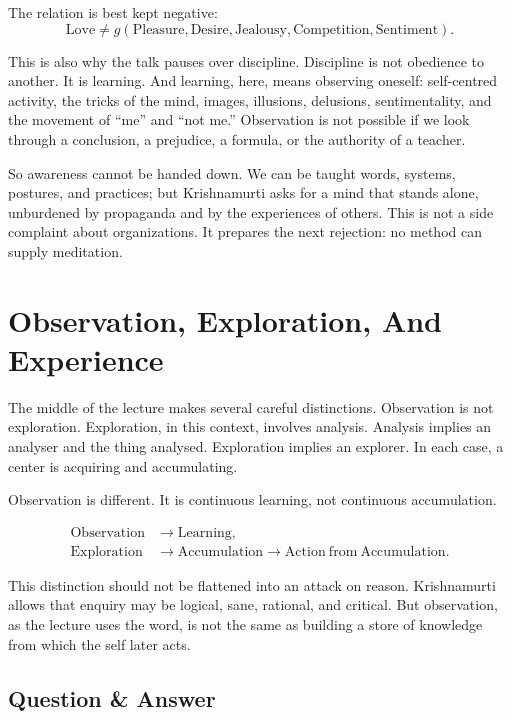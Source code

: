 The relation is best kept negative:
\begin{equation}
\mathrm{Love}
\neq
g(\mathrm{Pleasure},\mathrm{Desire},\mathrm{Jealousy},\mathrm{Competition},\mathrm{Sentiment}).
\end{equation}

This is also why the talk pauses over discipline. Discipline is not obedience to another. It is learning. And learning, here, means observing oneself: self-centred activity, the tricks of the mind, images, illusions, delusions, sentimentality, and the movement of ``me'' and ``not me.'' Observation is not possible if we look through a conclusion, a prejudice, a formula, or the authority of a teacher.

So awareness cannot be handed down. We can be taught words, systems, postures, and practices; but Krishnamurti asks for a mind that stands alone, unburdened by propaganda and by the experiences of others. This is not a side complaint about organizations. It prepares the next rejection: no method can supply meditation.

\section{Observation, Exploration, And Experience}

The middle of the lecture makes several careful distinctions. Observation is not exploration. Exploration, in this context, involves analysis. Analysis implies an analyser and the thing analysed. Exploration implies an explorer. In each case, a center is acquiring and accumulating.

Observation is different. It is continuous learning, not continuous accumulation.

\begin{align}
\mathrm{Observation} &\longrightarrow \mathrm{Learning},\\
\mathrm{Exploration} &\longrightarrow \mathrm{Accumulation}
\longrightarrow \mathrm{Action\ from\ Accumulation}.
\end{align}

This distinction should not be flattened into an attack on reason. Krishnamurti allows that enquiry may be logical, sane, rational, and critical. But observation, as the lecture uses the word, is not the same as building a store of knowledge from which the self later acts.

\subsection{Question \& Answer}

